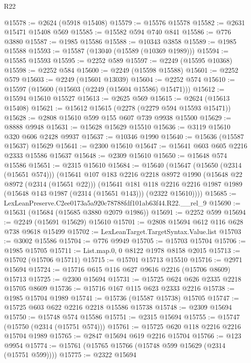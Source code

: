 \begin{lexlean}{R22}
\begin{coremodule}
@15578 := @2624 (@5918 @15408)
@15579 := @15576 @15578
@15582 := @2631 @15471 @15408 @569
@15585 := @15582 @594 @740 @841
@15586 := @776 @3880
@15587 := @1985 @15586
@15588 := @10343 @3858
@15589 := @1985 @15588
@15593 := @15587 (@13040 (@15589 (@10369 @1989)))
@15594 := @15585 @15593
@15595 := @2252 @589
@15597 := @2249 (@15595 @10368)
@15598 := @2252 @584
@15600 := @2249 (@15598 @15588)
@15601 := @2252 @579
@15603 := @2249 (@15601 @13039)
@15604 := @2252 @574
@15610 := @15597 (@15600 (@15603 (@2249 (@15604 @15586) @15471)))
@15612 := @15594 @15610 @15527
@15613 := @2625 @569
@15615 := @2624 (@15613 @15408)
@15621 := @15612 @15615 (@2278 (@2279 @594 @15593 @15471))
@15628 := @2808 @15610 @599 @155 @607 @739 @9938 @15500
@15629 := @8888 @9948
@15631 := @15628 @15629 @15510
@15636 := @3119 @15610 @320 @606 @2428 @9937
@15637 := @10346 @1990
@15640 := @15636 (@15587 @15637) @15629
@15641 := @2300 @15610
@15647 := @15641 @603 @605 @2216 @2333 @15586 @15637
@15648 := @2309 @15610
@15650 := @15648 @574 @15586
@15651 := @2315 @15610
@15684 := @15640
    (@15647
      (@15650 (@2314 (@15651 @574)))
      (@15641
        @107
        @183
        @2216
        @2218
        @8972
        @1990
        (@15648 @22 @8972 (@2314 (@15651 @22)))
        (@15641
          @181
          @118
          @2216
          @2216
          @1987
          @1989
          (@15648 @143 @1987 (@2314 (@15651 @143)))
          (@2322 @15610))))
@15685 := LexLeanPreserve.C2ee0173a5a920c78788fdf101ab63f44.R22.__rel_9
@15690 := @15631 (@15684 (@15685 @3880 @2079 @1986))
@15691 := @2252 @599
@15694 := @2249 (@15691 @15629) @15610
@15701 := @2808 @15694 @612 @116 @628 @738 @9618 @15499
@15702 := LexLeanTarget.TargetSyntax.Value.list
@15703 := @3002 @15586
@15704 := @776 @9949
@15705 := @15703 @15704
@15706 := @1985 @15705
@15711 := List.map.{0, 0} @8122 @1978 @8158 @2015
@15713 := @15702 (@15706 @15711)
@15715 := @15701 @15713 @15510
@15716 := @2971 @15694
@15724 := @15716 @615 @116 @627 @9616 @2216 (@15706 @8609) @15713
@15725 := @2300 @15694
@15731 := @15725 @624 @626 @2335 @2218 @15705 @8609
@15736 := @15716 @167 @115 @623 @2333 @2216
@15738 := @1985 @15704 @1989
@15741 := @15736 (@15587 @15738) @15705
@15747 := @15725 @603 @622 @2216 @2218 @15586 @15738
@15748 := @2309 @15694
@15750 := @15748 @574 @15586
@15751 := @2315 @15694
@15755 := @15747 (@15750 (@2314 (@15751 @574)))
@15761 := @15725 @620 @118 @2216 @2216 @15704 @1989
@15765 := @2847 @15694 @619 @2216 @15704
@15766 := @123 @9954
@15774 := @15761 (@15765 @15766 (@15748 @599 @15629 (@2314 (@15751 @599))))
@15775 := @2322 @15694

\end{coremodule}
\end{lexlean}
